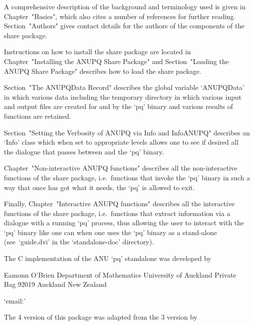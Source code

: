 \endlist


A comprehensive description of the background  and  terminology  used  is
given in Chapter~"Basics", which also cites a number  of  references  for
further reading. Section~"Authors" gives contact details for the  authors
of the components of the {\ANUPQ} share package.

Instructions on how to install the {\ANUPQ} share package are located  in
Chapter~"Installing the ANUPQ Share  Package"  and  Section~"Loading  the
ANUPQ Share Package" describes how to load the {\ANUPQ} share package.

Section~"The ANUPQData Record" describes the global variable  `ANUPQData'
in which various data including the temporary directory in which  various
input and output files are created for and by the `pq' binary and various
results of functions are retained.

Section~"Setting the Verbosity of ANUPQ via Info and InfoANUPQ" describes
an `Info' class which when set to appropriate levels allows one to see if
desired all the dialogue that passes between {\GAP} and the `pq' binary.

Chapter~"Non-interactive   ANUPQ    functions"    describes    all    the
non-interactive functions of the {\ANUPQ} share  package,  i.e.~functions
that invoke the `pq' binary in such a way that once {\GAP} has  got  what
it needs, the `pq' is allowed to exit.

Finally,  Chapter~"Interactive  ANUPQ  functions"   describes   all   the
interactive functions of the {\ANUPQ} share package, i.e.~functions  that
extract information via a dialogue with  a  running  `pq'  process,  thus
allowing the user to interact with the `pq' binary like one can when  one
uses  the  `pq'  binary  as  a  stand-alone   (see~`guide.dvi'   in   the
`standalone-doc' directory).


The C implementation of the ANU `pq' standalone was developed by

\begintt
Eamonn O'Brien
Department of Mathematics
University of Auckland
Private Bag 92019
Auckland
New Zealand
\endtt

{}`email:' 

The {\GAP} 4 version of this package was adapted from the {\GAP} 3
version by  

